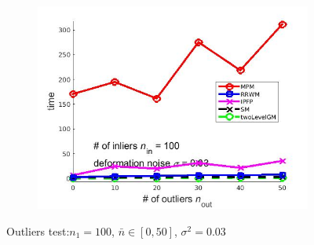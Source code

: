 \documentclass[
	fontsize=12pt,
	paper=a4,
	twoside=false,
	numbers=noenddot,
	plainheadsepline,
	toc=listof,
	toc=bibliography
]{scrartcl}
\begin{document}
\begin{figure}[h]
\begin{subfigure}[b]{0.3\textwidth}
		\includegraphics[scale=0.25]{"fig_ver2108/syntheticPointSets/outliertest_n50/time_greedy"} 
	\end{subfigure} 	
	\caption{ Outliers test:$n_1=100$, $\bar{n}\in[0,50]$, $\sigma^2=0.03$}
	\label{fig:outlier_test1}
\end{figure}

\FloatBarrier	
\end{document}
